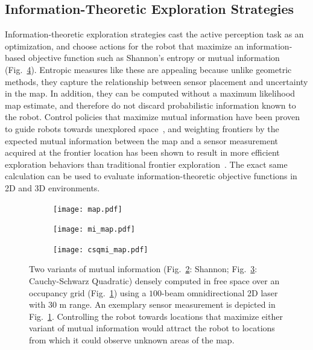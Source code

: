 \subsection{Information-Theoretic Exploration Strategies}

Information-theoretic exploration strategies cast the active perception task as
an optimization, and choose actions for the robot that maximize an information-based objective function such
as Shannon's entropy or mutual
information~\cite{bourgault2002information,kollar2008efficient,charrow2015icra,julian2013mutual}
(Fig.~\ref{fig:mi_vs_csqmi}).
Entropic measures like these are appealing because unlike geometric methods,
they capture the relationship between sensor placement and uncertainty in the
map. In addition, they can be computed without a maximum likelihood map estimate, and
therefore do not discard probabilistic information known to the robot. Control policies
that maximize mutual information have been proven to guide robots
towards unexplored space~\cite{julian2013mutual}, and weighting frontiers by
the expected mutual information between the map and a sensor measurement
acquired at the frontier location has been shown to result in more efficient exploration
behaviors than traditional frontier exploration~\cite{charrow2015icra}.
The exact same calculation can be used to evaluate information-theoretic objective
functions in 2D and 3D environments.

\begin{figure}[t]
    \centering
    \begin{subfigure}[t]{0.31\textwidth}
        \centering
        \texttt{[image: map.pdf]}
        \caption{\label{fig:og}}
    \end{subfigure}
    \begin{subfigure}[t]{0.31\textwidth}
        \centering
        \texttt{[image: mi\_map.pdf]}
        \caption{\label{fig:og_mi}}
    \end{subfigure}
    \begin{subfigure}[t]{0.31\textwidth}
        \centering
        \texttt{[image: csqmi\_map.pdf]}
        \caption{\label{fig:og_csqmi}}
    \end{subfigure}
    \caption[Maximizing mutual information drives a robot to unexplored areas.]{Two variants of mutual information (Fig.~\ref{fig:og_mi}: Shannon;
    Fig.~\ref{fig:og_csqmi}: Cauchy-Schwarz Quadratic) densely computed in free space
  over an occupancy grid (Fig.~\ref{fig:og}) using a $100$-beam omnidirectional 2D
laser with $30$ m range. An exemplary sensor measurement is depicted in
Fig.~\ref{fig:og}. Controlling the robot towards locations that maximize either variant
of mutual information would attract the robot to locations from which it
could observe unknown areas of the map. \label{fig:mi_vs_csqmi}}
\end{figure}

